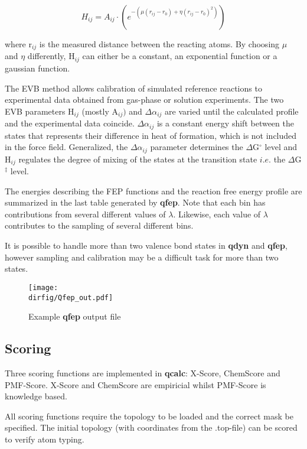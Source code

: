\documentclass[a4paper,10pt]{article}
\newcommand{\dirfig}{./pictures}
\begin{document}
\begin {equation}
H_{ij}=A_{ij}\cdot (e^{-(\mu (r_{ij}-r_{0}) + \eta
(r_{ij}-r_{0})^{2})})
\end {equation}

where r$_{ij}$ is the measured distance between the reacting
atoms. By choosing $\mu $ and $\eta $ differently, H$_{ij}$ can
either be a constant, an exponential function or a gaussian
function.

The EVB method allows calibration  of simulated reference reactions to
experimental data obtained from gas-phase or solution experiments. The
two  EVB  parameters H$_{ij}$  (mostly  A$_{ij})$  and $\Delta  \alpha
_{ij}$ are  varied until the  calculated profile and  the experimental
data  coincide.  $\Delta \alpha  _{ij}$  is  a constant  energy  shift
between  the  states  that  represents their  difference  in  heat  of
formation, which is not included  in the force field. Generalized, the
$\Delta \alpha  _{ij}$ parameter  determines the  $\Delta $G$^{\circ}$
level and H$_{ij}$ regulates the degree of mixing of the states at the
transition state $i.e.$ the $\Delta$G$^{\ddag }$ level.

The energies describing the FEP functions and the reaction free energy
profile are summarized  in the last table  generated by \textbf{qfep}.
Note that each bin has  contributions from several different values of
$\lambda$.  Likewise,  each  value  of $\lambda$  contributes  to  the
sampling of several different bins.

It  is  possible to  handle  more  than  two  valence bond  states  in
\textbf{qdyn} and \textbf{qfep}, however  sampling and calibration may
be a difficult task for more than two states.

\begin{figure}[h]
\caption{Example \textbf{qfep} output file}
\centering
\texttt{[image: \\dirfig/Qfep\_out.pdf]}
\label{fig:Qfep-out}
\end{figure}


\subsection{Scoring}\label{subsection:scoring} 
Three   scoring   functions   are   implemented   in   \textbf{qcalc}:
X-Score\cite{Wang:2002},       ChemScore\cite{Eldridge:1997}       and
PMF-Score\cite{Muegge:1999}.   X-Score  and ChemScore  are  empiricial
whilst PMF-Score is knowledge based.

All  scoring functions  require  the  topology to  be  loaded and  the
correct mask be specified. The initial topology (with coordinates from
the .top-file) can be scored to verify atom typing.
\end{document}
